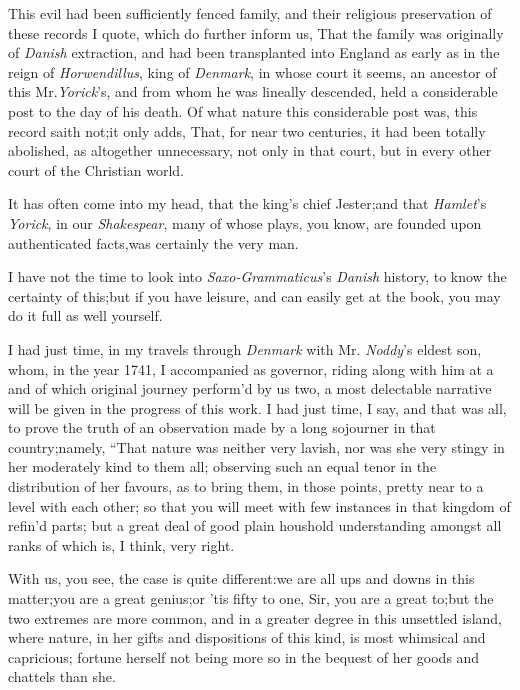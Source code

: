 \documentclass{article}
\begin{document}
\vspace\parskip
This evil had been sufficiently fenced 
family, and their religious
preservation of these records I quote, which do further inform us,
That the family was originally of \textit{Danish} extraction, and had
been transplanted into England as early as in the reign of
\textit{Horwendillus}, king of \textit{Denmark}, in whose court it
seems, an ancestor of this Mr.\@ \textit{Yorick}’s, and from whom
he was lineally descended, held a considerable post to the day of
his death. Of what nature this considerable post was, this record
saith not;\tsk  it only adds, That, for near two centuries, it had
been totally abolished, as altogether unnecessary, not only in that
court, but in every other court of the Christian world.

It has often come into my head, that 
the king’s chief Jester;\tsk  and that
\textit{Hamlet}’s \textit{Yorick}, in our \textit{Shakespear},
many of whose plays, you know, are founded upon authenticated
facts,\tsk was certainly the very man.

I have not the time to look into \textit{Saxo-Grammaticus}’s
\textit{Danish} history, to know the certainty of this;\tsk  but if
you have leisure, and can easily get at the book, you may do
it full as well yourself.

I had just time, in my travels through \textit{Denmark} with Mr.\@
\textit{Noddy}’s eldest son, whom, in the year 1741, I
accompanied as governor, riding along with him at a
and of which original journey
perform’d by us two, a most delectable narrative will be given in
the progress of this work.\break
I had just time, I say, and that was
all, to prove the truth of an observation made by a long sojourner
in that country;\tsh\break namely, “That nature was
neither very lavish, nor was she very stingy in her\break
{}
moderately kind to them all; observing such an equal tenor in
the distribution of her favours, as to bring them, in those points,
pretty near to a level with each other; so that you will meet with
few instances in that kingdom of refin’d parts; but a great
deal of good plain hous\-hold understanding amongst all
ranks of
which is, I think, very right.

With us, you see, the case is quite different:\tsk  we are all
ups and downs in this matter;\tsk  you are a great
genius;\tsk\break  or ’tis fifty to one, Sir, you are a great
to;\tsk  but the two extremes are more common, and in a
greater degree in this unsettled island, where nature, in her gifts
and dispositions of this kind, is most whimsical and capricious;
fortune herself not being more so in the bequest of her goods and
chattels than she.
\end{document}
